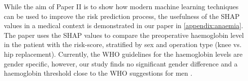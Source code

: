While the aim of Paper II is to show how modern machine learning techniques can be used to improve the risk prediction process, the usefulness of the SHAP values in a medical context is demonstrated in our paper in \autoref{appendix:anaemia}. The paper uses the SHAP values to compare the preoperative haemoglobin level in the patient with the risk-score, stratified by sex and operation type (knee vs. hip replacement). Currently, the WHO guidelines for the haemoglobin levels are gender specific, however, our study finds no significant gender difference and a haemoglobin threshold close to the WHO suggestions for men \autocite{anaemiasNutritionalAnaemiasReport1968}.
